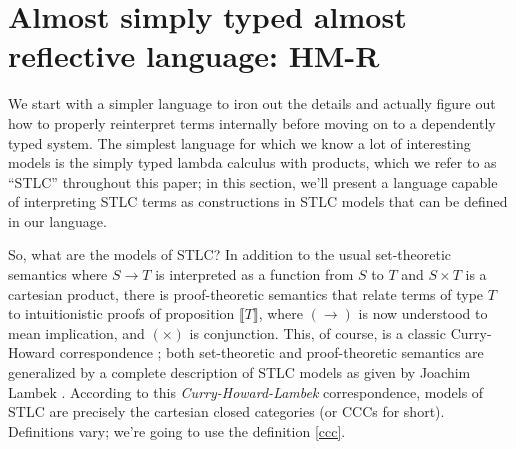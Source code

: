\section{
    Almost simply typed almost reflective language: HM-R
}\label{HM-R}

We start with a simpler language to iron out the details
and actually figure out how to properly reinterpret
terms internally before moving on to a dependently typed
system. The simplest language for which we know a lot of
interesting models is the simply typed lambda calculus with
products, which we refer to as ``STLC'' throughout
this paper; in this section, we'll present a language
capable of interpreting STLC terms as constructions in
STLC models that can be defined in our language.

So, what are the models of STLC? In addition to the usual
set-theoretic semantics where $S\to T$ is interpreted as
a function from $S$ to $T$ and $S\times T$ is a
cartesian product, there is proof-theoretic semantics
that relate terms of type $T$ to intuitionistic proofs
of proposition $\llbracket T\rrbracket$, where $(\to)$
is now understood to mean implication, and $(\times)$ is
conjunction. This, of course, is a classic Curry-Howard
correspondence \cite{ho80}; both set-theoretic and
proof-theoretic semantics are generalized by a complete
description of STLC models as given by Joachim Lambek
\cite{Lambek1980}. According to this
\textit{Curry-Howard-Lambek} correspondence, models
of STLC are precisely the cartesian closed categories (or
CCCs for short). Definitions vary; we're going to use
the definition \ref{ccc}.

